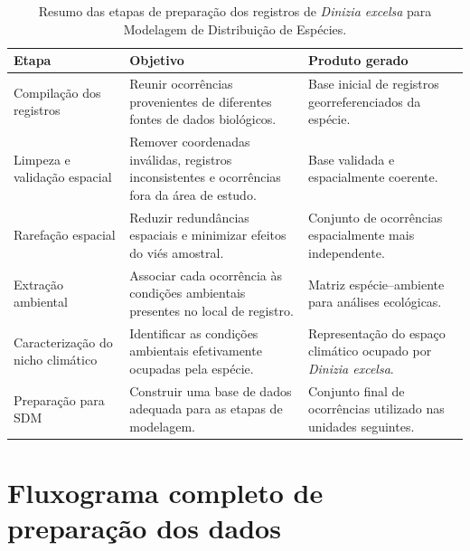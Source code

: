 \begin{table}[H]
	\centering
	\caption{Resumo das etapas de preparação dos registros de \textit{Dinizia excelsa} para Modelagem de Distribuição de Espécies.}
	\label{tab:fluxo_preparacao_dinizia}
	\begin{tabular}{p{3.2cm}p{5.2cm}p{5.2cm}}
		\toprule
		\textbf{Etapa} &
		\textbf{Objetivo} &
		\textbf{Produto gerado} \\
		\midrule
		
		Compilação dos registros
		&
		Reunir ocorrências provenientes de diferentes fontes de dados biológicos.
		&
		Base inicial de registros georreferenciados da espécie.
		
		\\
		
		Limpeza e validação espacial
		&
		Remover coordenadas inválidas, registros inconsistentes e ocorrências fora da área de estudo.
		&
		Base validada e espacialmente coerente.
		
		\\
		
		Rarefação espacial
		&
		Reduzir redundâncias espaciais e minimizar efeitos do viés amostral.
		&
		Conjunto de ocorrências espacialmente mais independente.
		
		\\
		
		Extração ambiental
		&
		Associar cada ocorrência às condições ambientais presentes no local de registro.
		&
		Matriz espécie--ambiente para análises ecológicas.
		
		\\
		
		Caracterização do nicho climático
		&
		Identificar as condições ambientais efetivamente ocupadas pela espécie.
		&
		Representação do espaço climático ocupado por \textit{Dinizia excelsa}.
		
		\\
		
		Preparação para SDM
		&
		Construir uma base de dados adequada para as etapas de modelagem.
		&
		Conjunto final de ocorrências utilizado nas unidades seguintes.
		
		\\
		
		\bottomrule
	\end{tabular}
\end{table}

\section{Fluxograma completo de preparação dos dados}

